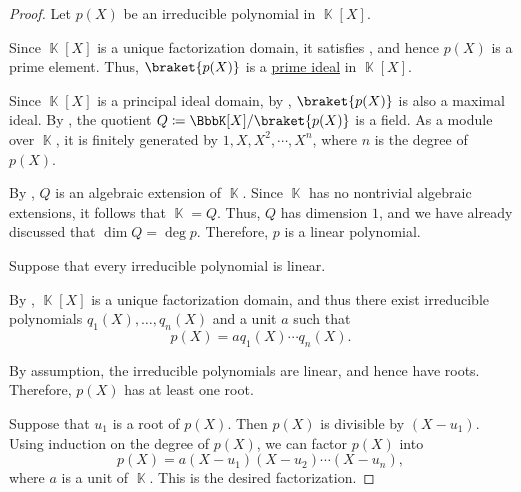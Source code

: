 \begin{proof}
   Let \( p(X) \) be an irreducible polynomial in \( \BbbK[X] \).

  Since \( \BbbK[X] \) is a unique factorization domain, it satisfies , and hence \( p(X) \) is a prime element. Thus, \( \braket {p(X)} \) is a \hyperref[def:semiring_ideal/prime]{prime ideal} in \( \BbbK[X] \).

  Since \( \BbbK[X] \) is a principal ideal domain, by , \( \braket{ p(X) } \) is also a maximal ideal. By , the quotient \( Q \coloneqq \BbbK[X] / \braket{ p(X) } \) is a field. As a module over \( \BbbK \), it is finitely generated by \( 1, X, X^2, \cdots, X^n \), where \( n \) is the degree of \( p(X) \).

  By , \( Q \) is an algebraic extension of \( \BbbK \). Since \( \BbbK \) has no nontrivial algebraic extensions, it follows that \( \BbbK = Q \). Thus, \( Q \) has dimension \( 1 \), and we have already discussed that \( \dim Q = \deg p \). Therefore, \( p \) is a linear polynomial.

   Suppose that every irreducible polynomial is linear.

  By , \( \BbbK[X] \) is a unique factorization domain, and thus there exist irreducible polynomials \( q_1(X), \ldots, q_n(X) \) and a unit \( a \) such that
  \begin{equation*}
    p(X) = a q_1(X) \cdots q_n(X).
  \end{equation*}

  By assumption, the irreducible polynomials are linear, and hence have roots. Therefore, \( p(X) \) has at least one root.

   Suppose that \( u_1 \) is a root of \( p(X) \). Then \( p(X) \) is divisible by \( (X - u_1) \). Using induction on the degree of \( p(X) \), we can factor \( p(X) \) into
  \begin{equation*}
    p(X) = a (X - u_1) (X - u_2) \cdots (X - u_n),
  \end{equation*}
  where \( a \) is a unit of \( \BbbK \). This is the desired factorization.


\end{proof}
